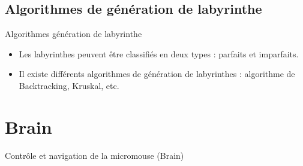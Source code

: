 \documentclass{beamer}
\begin{document}
\subsection{Algorithmes de génération de labyrinthe}


\begin{frame}{Algorithmes génération de labyrinthe}
\begin{itemize}
\item Les labyrinthes peuvent être classifiés en deux types :   parfaits et imparfaits.
\item Il existe différents algorithmes de génération de labyrinthes : algorithme de Backtracking, Kruskal, etc.

\end{itemize}
\end{frame}


\section{Brain}
\begin{frame}{Contrôle et navigation de la micromouse (Brain)}


\end{frame}
\end{document}
